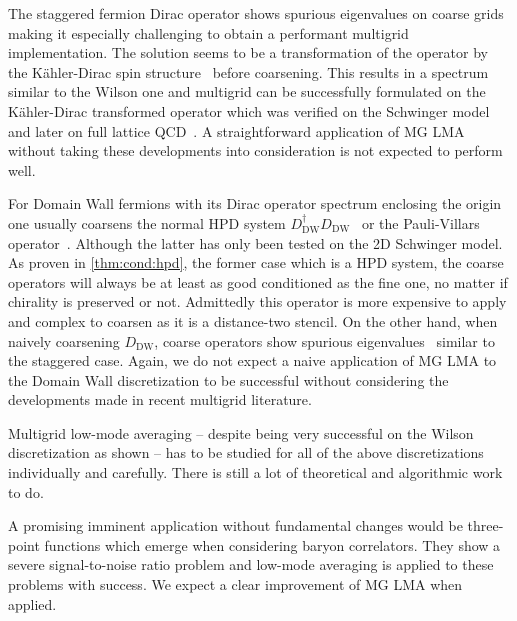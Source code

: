 The staggered fermion Dirac operator shows spurious eigenvalues on coarse grids~\cite{Brower:2018ymy} making it especially challenging to obtain a performant multigrid implementation.
The solution seems to be a transformation of the operator by the Kähler-Dirac spin structure~\cite{Becher:1982ud,Bodwin:1987ah} before coarsening.
This results in a spectrum similar to the Wilson one and multigrid can be successfully formulated on the Kähler-Dirac transformed operator which was verified on the Schwinger model~\cite{Brower:2018ymy} and later on full lattice QCD~\cite{Ayyar:2022krp}.
A straightforward application of MG LMA without taking these developments into consideration is not expected to perform well.

For Domain Wall fermions with its Dirac operator spectrum enclosing the origin one usually coarsens the normal HPD system $D_{\text{DW}}^{\dagger} D_{\text{DW}}$~\cite{Cohen:2011ivh,Boyle:2014rwa} or the Pauli-Villars operator~\cite{Brower:2020xmc}.
Although the latter has only been tested on the 2D Schwinger model.
As proven in \cref{thm:cond:hpd}, the former case which is a HPD system, the coarse operators will always be at least as good conditioned as the fine one, no matter if chirality is preserved or not.
Admittedly this operator is more expensive to apply and complex to coarsen as it is a distance-two stencil.
On the other hand, when naively coarsening $D_{\text{DW}}$, coarse operators show spurious eigenvalues~\cite{Brower:2020xmc} similar to the staggered case.
Again, we do not expect a naive application of MG LMA to the Domain Wall discretization to be successful without considering the developments made in recent multigrid literature.

Multigrid low-mode averaging -- despite being very successful on the Wilson discretization as shown -- has to be studied for all of the above discretizations individually and carefully.
There is still a lot of theoretical and algorithmic work to do.

A promising imminent application without fundamental changes would be three-point functions which emerge when considering baryon correlators.
They show a severe signal-to-noise ratio problem and low-mode averaging is applied to these problems with success.
We expect a clear improvement of MG LMA when applied.


